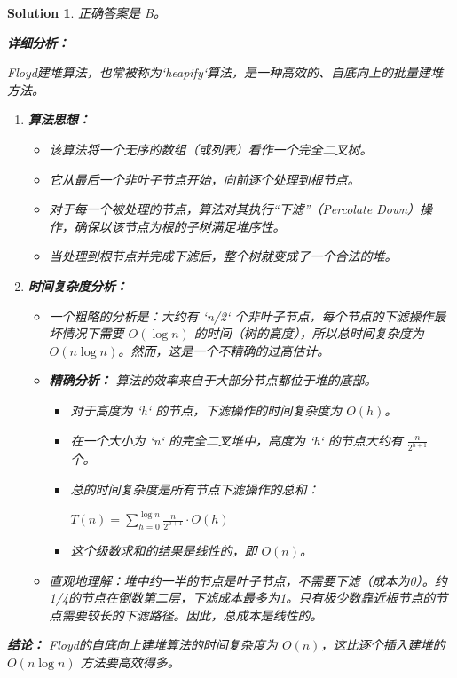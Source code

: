 \documentclass[UTF8]{report}
\newtheorem{solution}{Solution}
\theoremstyle{MyLineTheoremStyle} %
\theoremstyle{MyBlockTheoremStyle} %
\theoremstyle{MySubsubsectionStyle} %
\begin{document}
\begin{solution}
正确答案是 B。

\textbf{详细分析：}

Floyd建堆算法，也常被称为`heapify`算法，是一种高效的、自底向上的批量建堆方法。

\begin{enumerate}
    \item \textbf{算法思想：}
    \begin{itemize}
        \item 该算法将一个无序的数组（或列表）看作一个完全二叉树。
        \item 它从最后一个非叶子节点开始，向前逐个处理到根节点。
        \item 对于每一个被处理的节点，算法对其执行“下滤”（Percolate Down）操作，确保以该节点为根的子树满足堆序性。
        \item 当处理到根节点并完成下滤后，整个树就变成了一个合法的堆。
    \end{itemize}

    \item \textbf{时间复杂度分析：}
    \begin{itemize}
        \item 一个粗略的分析是：大约有 `n/2` 个非叶子节点，每个节点的下滤操作最坏情况下需要 $O(\log n)$ 的时间（树的高度），所以总时间复杂度为 $O(n \log n)$。然而，这是一个不精确的过高估计。
        \item \textbf{精确分析：} 算法的效率来自于大部分节点都位于堆的底部。
        \begin{itemize}
            \item 对于高度为 `h` 的节点，下滤操作的时间复杂度为 $O(h)$。
            \item 在一个大小为 `n` 的完全二叉堆中，高度为 `h` 的节点大约有 $\frac{n}{2^{h+1}}$ 个。
            \item 总的时间复杂度是所有节点下滤操作的总和：
            \begin{center}
            $T(n) = \sum_{h=0}^{\log n} \frac{n}{2^{h+1}} \cdot O(h)$
            \end{center}
            \item 这个级数求和的结果是线性的，即 $O(n)$。
        \end{itemize}
        \item 直观地理解：堆中约一半的节点是叶子节点，不需要下滤（成本为0）。约1/4的节点在倒数第二层，下滤成本最多为1。只有极少数靠近根节点的节点需要较长的下滤路径。因此，总成本是线性的。
    \end{itemize}
\end{enumerate}

\textbf{结论：}
Floyd的自底向上建堆算法的时间复杂度为 $O(n)$，这比逐个插入建堆的 $O(n \log n)$ 方法要高效得多。
\end{solution}
\end{document}
